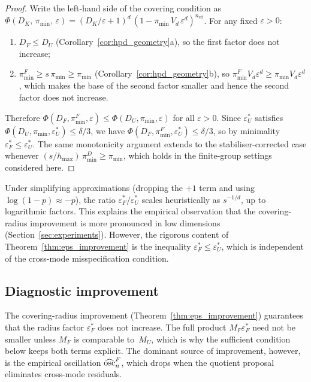 \begin{proof}
  Write the left-hand side of the covering condition as
  $\Phi(D_K,\, \pi_{\min},\, \varepsilon)
  = (D_K/\varepsilon + 1)^d\,
  (1 - \pi_{\min}\, V_d\, \varepsilon^d)^{n_{\mathrm{eff}}}$.
  For any fixed $\varepsilon > 0$:
  \begin{enumerate}[nosep]
    \item $D_F \leq D_U$
    (Corollary~\ref{cor:hpd_geometry}a), so the first factor does not
    increase;
    \item $\pi_{\min}^F \geq s\,\pi_{\min} \geq \pi_{\min}$
    (Corollary~\ref{cor:hpd_geometry}b), so
    $\pi_{\min}^F V_d \varepsilon^d \geq \pi_{\min} V_d \varepsilon^d$,
    which makes the base of the second factor smaller and hence the
    second factor does not increase.
  \end{enumerate}
  Therefore $\Phi(D_F, \pi_{\min}^F, \varepsilon)
  \leq \Phi(D_U, \pi_{\min}, \varepsilon)$ for all
  $\varepsilon > 0$.
  Since $\varepsilon_U^*$ satisfies
  $\Phi(D_U, \pi_{\min}, \varepsilon_U^*) \leq \delta/3$, we have
  $\Phi(D_F, \pi_{\min}^F, \varepsilon_U^*) \leq \delta/3$, so by
  minimality $\varepsilon_F^* \leq \varepsilon_U^*$.
  The same monotonicity argument extends to the stabiliser-corrected
  case whenever $(s/h_{\max})\,\pi_{\min}^D \geq \pi_{\min}$, which
  holds in the finite-group settings considered here.
\end{proof}

\begin{remark}\label{rem:eps_scaling}
  Under simplifying approximations (dropping the $+1$ term and using
  $\log(1 - p) \approx -p$), the ratio
  $\varepsilon_F^* / \varepsilon_U^*$ scales heuristically as
  $s^{-1/d}$, up to logarithmic factors.  This explains the
  empirical observation that the covering-radius improvement is
  more pronounced in low dimensions
  (Section~\ref{sec:experiments}).  However, the rigorous content
  of Theorem~\ref{thm:eps_improvement} is the inequality
  $\varepsilon_F^* \leq \varepsilon_U^*$, which is independent of
  the cross-mode misspecification condition.
\end{remark}


\subsection{Diagnostic improvement}
\label{sec:gap_improvement}

The covering-radius improvement (Theorem~\ref{thm:eps_improvement})
guarantees that the radius factor $\varepsilon_F^*$ does not
increase.  The full product $M_F\varepsilon_F^*$ need not be
smaller unless $M_F$ is comparable to~$M_U$, which is why the
sufficient condition below keeps both terms explicit.
The dominant source of improvement, however, is the empirical
oscillation $\widehat{\mathrm{osc}}_n^F$, which drops when the quotient
proposal eliminates cross-mode residuals.

